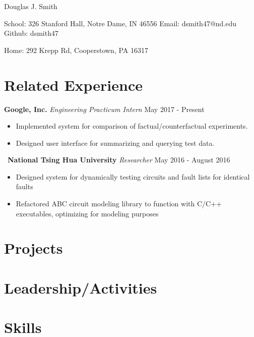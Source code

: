 \documentclass[10pt]{article}
\begin{document}
  \centerline{
    Douglas J. Smith
  }
  \centerline{
    School: 326 Stanford Hall, Notre Dame, IN 46556
    Email: dsmith47@nd.edu
    Github: dsmith47
  }
  \centerline{
    Home: 292 Krepp Rd, Cooperstown, PA 16317
  }

  \section*{Related Experience}
    \textbf{Google, Inc.}
    \hfill
    \textit{Engineering Practicum Intern}
    \hfill
    May 2017 - Present
    \begin{itemize}
      \item Implemented system for comparison of factual/counterfactual experiments.
      \item Designed user interface for summarizing and querying test data. 
    \end{itemize}
    \ 
    \textbf{National Tsing Hua University}
    \hfill
    \textit{Researcher}
    \hfill
    May 2016 - August 2016
    
    \begin{itemize}
      \item Designed system for dynamically testing circuits and fault lists for identical faults
      \item Refactored ABC circuit modeling library to function with C/C++ executables, optimizing for modeling purposes
    \end{itemize}
  
    \textbf{}
    \hfill
    \textit{}
    \hfill
    
    \begin{itemize}
      
    \end{itemize}
  
    \textbf{}
    \hfill
    \textit{}
    \hfill
    
    \begin{itemize}
      
    \end{itemize}

  \section*{Projects}

  \section*{Leadership/Activities}

  \section*{Skills}
\end{document}

